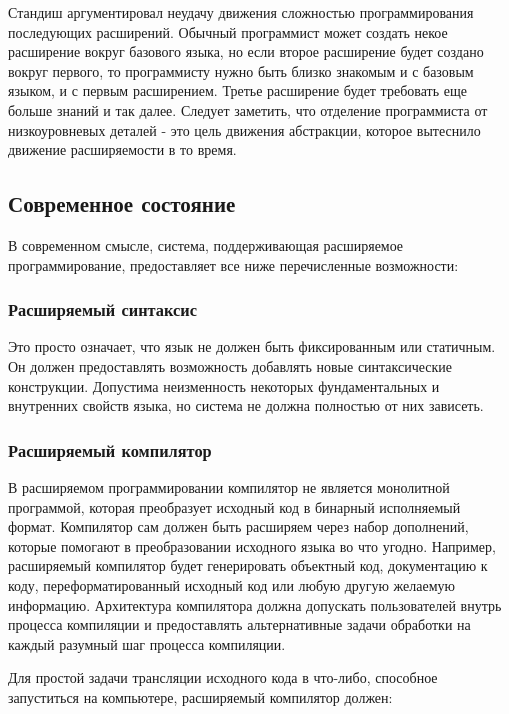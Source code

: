\documentclass[a4paper,12pt]{article}
\begin{document}
Стандиш аргументировал неудачу движения сложностью программирования последующих
расширений. Обычный программист может создать некое расширение вокруг базового
языка, но если второе расширение будет создано вокруг первого, то программисту
нужно быть близко знакомым и с базовым языком, и с первым расширением. Третье
расширение будет требовать еще больше знаний и так далее. Следует заметить, что
отделение программиста от низкоуровневых деталей - это цель движения
абстракции, которое вытеснило движение расширяемости в то время.

\subsection{Современное состояние}

В современном смысле, система, поддерживающая расширяемое программирование,
предоставляет все ниже перечисленные возможности:

\subsubsection{Расширяемый синтаксис}

Это просто означает, что язык не должен быть фиксированным или статичным. Он
должен предоставлять возможность добавлять новые синтаксические конструкции.
Допустима неизменность некоторых фундаментальных и внутренних свойств языка, но
система не должна полностью от них зависеть.

\subsubsection{Расширяемый компилятор}

В расширяемом программировании компилятор не является монолитной программой,
которая преобразует исходный код в бинарный исполняемый формат. Компилятор сам
должен быть расширяем через набор дополнений, которые помогают в преобразовании
исходного языка во что угодно. Например, расширяемый компилятор будет
генерировать объектный код, документацию к коду, переформатированный исходный
код или любую другую желаемую информацию. Архитектура компилятора должна
допускать пользователей внутрь процесса компиляции и предоставлять
альтернативные задачи обработки на каждый разумный шаг процесса компиляции.

Для простой задачи трансляции исходного кода в что-либо, способное запуститься
на компьютере, расширяемый компилятор должен:
\end{document}
